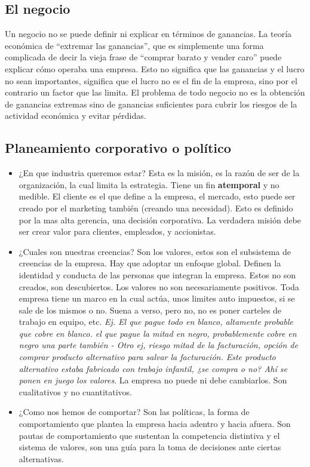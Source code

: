 \documentclass[titlepage,a4paper]{article}
\begin{document}
\subsection{El negocio}
Un negocio no se puede definir ni explicar en términos de ganancias. La teoría económica de “extremar las ganancias”, que es simplemente una forma complicada de decir la vieja frase de “comprar barato y vender caro” puede explicar cómo operaba una empresa. Esto no significa que las ganancias y el lucro no sean importantes, significa que el lucro no es el fin de la empresa, sino por el contrario un factor que las limita. 
El problema de todo negocio no es la obtención de ganancias extremas sino de ganancias suficientes para cubrir los riesgos de la actividad económica y evitar pérdidas. 

\subsection{Planeamiento corporativo o político}
\begin{itemize}
    \item ¿En que industria queremos estar? Esta es la misión, es la razón de ser de la organización, la cual limita la estrategia. Tiene un fin \textbf{atemporal} y no medible. El cliente es el que define a la empresa, el mercado, esto puede ser creado por el marketing también (creando una necesidad). Esto es definido por la mas alta gerencia, una decisión corporativa. La verdadera misión debe ser crear valor para clientes, empleados, y accionistas.
    
    \item ¿Cuales son nuestras creencias? Son los valores, estos son el subsistema de creencias de la empresa. Hay que adoptar un enfoque global. Definen la identidad y conducta de las personas que integran la empresa. Estos no son creados, son descubiertos. Los valores no son necesariamente positivos. Toda empresa tiene un marco en la cual actúa, unos limites auto impuestos, si se sale de los mismos o no. Suena a verso, pero no, no es poner carteles de trabajo en equipo, etc. \textit{Ej. El que pague todo en blanco, altamente probable que cobre en blanco. el que pague la mitad en negro, probablemente cobre en negro una parte también - Otro ej, riesgo mitad de la facturación, opción de comprar producto alternativo para salvar la facturación. Este producto alternativo estaba fabricado con trabajo infantil, ¿se compra o no? Ahí se ponen en juego los valores}. La empresa no puede ni debe cambiarlos. Son cualitativos y no cuantitativos.
    
    \item ¿Como nos hemos de comportar? Son las políticas, la forma de comportamiento que plantea la empresa hacia adentro y hacia afuera. Son pautas de comportamiento que sustentan la competencia distintiva y el sistema de valores, son una guía para la toma de decisiones ante ciertas alternativas. 
\end{itemize}
\end{document}
